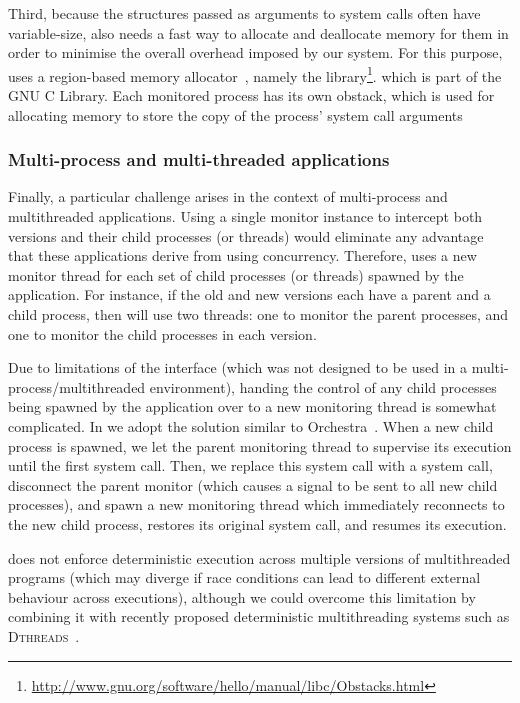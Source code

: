 Third, because the structures passed as arguments to system calls often have
variable-size, \mxm also needs a fast way to allocate and deallocate memory
for them in order to minimise the overall overhead imposed by our system.  For
this purpose, \mxm uses a region-based memory allocator~\cite{memory-pools},
namely the 
library\footnote{\url{http://www.gnu.org/software/hello/manual/libc/Obstacks.html}}.
which is part of the GNU C Library.  Each monitored process has its own
obstack, which is used for allocating memory to store the copy of the process'
system call arguments

\subsubsection{Multi-process and multi-threaded applications}

Finally, a particular challenge arises in the context of multi-process and
multithreaded applications.  Using a single monitor instance to intercept both
versions and their child processes (or threads) would eliminate any advantage
that these applications derive from using concurrency.  Therefore, \mxm uses a
new monitor thread for each set of child processes (or threads) spawned by the
application.  For instance, if the old and new versions each have a parent and
a child process, then \mxm will use two threads: one to monitor the parent
processes, and one to monitor the child processes in each version.

Due to limitations of the \ptrace interface (which was not designed to be used
in a multi-process/multithreaded environment), handing the control of any
child processes being spawned by the application over to a new monitoring
thread is somewhat complicated.  In \mxm we adopt the solution similar to
Orchestra~\cite{orchestra09}.  When a new child process is spawned, we let the
parent monitoring thread to supervise its execution until the first system
call.  Then, we replace this system call with a  system call,
disconnect the parent monitor (which causes a  signal to be
sent to all new child processes), and spawn a new monitoring thread which
immediately reconnects to the new child process, restores its original system
call, and resumes its execution.

\mxm does not enforce deterministic execution across multiple versions of
multithreaded programs (which may diverge if race conditions can lead
to different external behaviour across executions), although we could
overcome this limitation by combining it with recently proposed
deterministic multithreading systems such
as \textsc{Dthreads}~\cite{dthreads:sosp11}.

